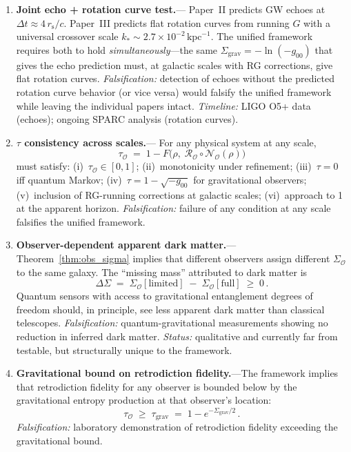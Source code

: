\documentclass[prd,twocolumn,superscriptaddress,longbibliography,floatfix]{revtex4-2}
\newcommand{\Petz}{\mathcal{R}}
\newcommand{\chan}{\mathcal{N}}
\newcommand{\tauasym}{\tau}
\newcommand{\rs}{r_{\mathrm{s}}}
\newcommand{\Sgrav}{\Sigma_{\mathrm{grav}}}
\newcommand{\SigO}{\Sigma_{\mathcal{O}}}
\newcommand{\tauO}{\tauasym_{\mathcal{O}}}
\begin{document}
\begin{enumerate}

\item \textbf{Joint echo + rotation curve test.}---
Paper~II predicts GW echoes at
$\Delta t \approx 4\,\rs/c$.  Paper~III predicts flat
rotation curves from running $G$ with a universal
crossover scale $k_* \sim 2.7 \times 10^{-2}\,
\mathrm{kpc}^{-1}$.  The unified framework requires
both to hold \emph{simultaneously}---the same
$\Sgrav = -\ln(-g_{00})$ that gives the echo prediction
must, at galactic scales with RG corrections, give flat
rotation curves.  \emph{Falsification:} detection of
echoes without the predicted rotation curve behavior
(or vice versa) would falsify the unified framework
while leaving the individual papers intact.
\emph{Timeline:} LIGO O5+ data (echoes); ongoing
SPARC analysis (rotation curves).

\item \textbf{$\tauasym$ consistency across scales.}---
For any physical system at any scale,
\begin{equation}
\tauO \;=\; 1 - F\!\bigl(\rho,\;
\Petz_{\mathcal{O}}\!\circ\!\chan_{\mathcal{O}}(\rho)\bigr)
\label{eq:consistency}
\end{equation}
must satisfy: (i)~$\tauO \in [0,1]$;
(ii)~monotonicity under refinement;
(iii)~$\tauasym = 0$ iff quantum Markov;
(iv)~$\tauasym = 1 - \sqrt{-g_{00}}$ for gravitational
observers; (v)~inclusion of RG-running corrections at
galactic scales; (vi)~approach to 1 at the apparent
horizon.
\emph{Falsification:} failure of any condition at any
scale falsifies the unified framework.

\item \textbf{Observer-dependent apparent dark matter.}---
Theorem~\ref{thm:obs_sigma} implies that different
observers assign different $\SigO$ to the same galaxy.
The ``missing mass'' attributed to dark matter is
\begin{equation}
\Delta\Sigma \;=\; \SigO[{\mathrm{limited}}]
\;-\; \SigO[{\mathrm{full}}] \;\geq\; 0\,.
\label{eq:apparent_DM}
\end{equation}
Quantum sensors with access to gravitational entanglement
degrees of freedom should, in principle, see less apparent
dark matter than classical telescopes.
\emph{Falsification:} quantum-gravitational measurements
showing no reduction in inferred dark matter.
\emph{Status:} qualitative and currently far from
testable, but structurally unique to the framework.

\item \textbf{Gravitational bound on retrodiction
fidelity.}---The framework implies that retrodiction
fidelity for any observer is bounded below by the
gravitational entropy production at that observer's
location:
\begin{equation}
\tauO \;\geq\; \tauasym_{\mathrm{grav}}
\;=\; 1 - e^{-\Sgrav/2}\,.
\label{eq:retrodiction_bound}
\end{equation}
\emph{Falsification:} laboratory demonstration of
retrodiction fidelity exceeding the gravitational
bound.


\end{enumerate}
\end{document}
